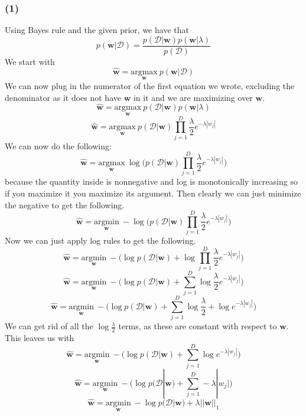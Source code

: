 \documentclass{article}
\newcommand*{\wb}{\ensuremath{\mathbf{w}}}
\begin{document}
\subsubsection*{(1)}
Using Bayes rule and the given prior, we have that
\[ p(\wb|\mathcal{D}) = \frac{p(\mathcal{D}|\wb)p(\wb|\lambda)}
    {p(\mathcal{D})} \]
We start with
\[ \hat{\wb} = \underset{\wb}{\text{argmax}} \> p(\wb|\mathcal{D}) \]
We can now plug in the numerator of the first equation we wrote, excluding the
denominator as it does not have $\wb$ in it and we are maximizing over $\wb$.
\[ \hat{\wb} = \underset{\wb}{\text{argmax}} \> p(\mathcal{D}|\wb)
    p(\wb|\lambda) \]
\[ \hat{\wb} = \underset{\wb}{\text{argmax}} \>
    p(\mathcal{D}|\wb) \prod_{j=1}^{D} \frac{\lambda}{2} e^{-\lambda |w_j|} \]
We can now do the following:
\[ \hat{\wb} = \underset{\wb}{\text{argmax}} \>
    \log \Big(p(\mathcal{D}|\wb) \prod_{j=1}^{D} \frac{\lambda}{2}
    e^{-\lambda |w_j|} \Big) \]
because the quantity inside is nonnegative and log is monotonically
increasing so if you maximize it you maximize its argument. Then clearly we can just
minimize the negative to get the following.
\[ \hat{\wb} = \underset{\wb}{\text{argmin}} \>
    -\log \Big(p(\mathcal{D}|\wb)
    \prod_{j=1}^{D} \frac{\lambda}{2} e^{-\lambda |w_j|} \Big) \]
Now we can just apply log rules to get the following.
\[ \hat{\wb} = \underset{\wb}{\text{argmin}} \>
    - \Big( \log p(\mathcal{D}|\wb)
    + \log \prod_{j=1}^{D} \frac{\lambda}{2} e^{-\lambda |w_j|} \Big) \]
\[ \hat{\wb} = \underset{\wb}{\text{argmin}} \>
    - \Big( \log p(\mathcal{D}|\wb)
    + \sum_{j=1}^D \log \frac{\lambda}{2} e^{-\lambda |w_j|} \Big) \]
\[ \hat{\wb} = \underset{\wb}{\text{argmin}} \>
    - \Big( \log p(\mathcal{D}|\wb)
    + \sum_{j=1}^D \log \frac{\lambda}{2} + \log e^{-\lambda |w_j|} \Big) \]
We can get rid of all the $\log \frac{\lambda}{2}$ terms, as these are constant
with respect to $\wb$. This leaves us with
\[ \hat{\wb} = \underset{\wb}{\text{argmin}} \>
    - \Big( \log p(\mathcal{D}|\wb)
    + \sum_{j=1}^D \log e^{-\lambda |w_j|} \Big) \]
\[ \hat{\wb} = \underset{\wb}{\text{argmin}} \>
    - \Big( \log p(\mathcal{D}|\wb)
    + \sum_{j=1}^D -\lambda |w_j| \Big) \]
\[ \hat{\wb} = \underset{\wb}{\text{argmin}} \>
    - \log p(\mathcal{D}|\wb) + \lambda ||\wb||_1 \]
\end{document}
